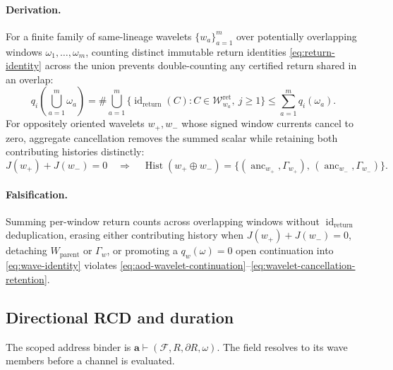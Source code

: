 \paragraph{Derivation.}
For a finite family of same-lineage wavelets \(\{w_a\}_{a=1}^m\) over
potentially overlapping windows \(\omega_1,\ldots,\omega_m\), counting distinct
immutable return identities \eqref{eq:return-identity} across the union
prevents double-counting any certified return shared in an overlap:
\begin{equation}
q_i\!\left(\bigcup_{a=1}^m\omega_a\right)
=\#\bigcup_{a=1}^m\bigl\{\operatorname{id}_{\mathrm{return}}(C):C\in\mathcal W_{w_a}^{\mathrm{ret}},\ j\ge 1\bigr\}
\le\sum_{a=1}^m q_i(\omega_a).
\label{eq:wavelet-overlap-dedup}
\end{equation}
For oppositely oriented wavelets \(w_+,w_-\) whose signed window currents
cancel to zero, aggregate cancellation removes the summed scalar while
retaining both contributing histories distinctly:
\begin{equation}
J(w_+)+J(w_-)=0
\quad\Longrightarrow\quad
\operatorname{Hist}(w_+\oplus w_-)=\bigl\{(\operatorname{anc}_{w_+},\Gamma_{w_+}),\,(\operatorname{anc}_{w_-},\Gamma_{w_-})\bigr\}.
\label{eq:wavelet-cancellation-retention}
\end{equation}

\paragraph{Falsification.}
Summing per-window return counts across overlapping windows without
\(\operatorname{id}_{\mathrm{return}}\) deduplication, erasing either
contributing history when \(J(w_+)+J(w_-)=0\), detaching \(W_{\mathrm{parent}}\)
or \(\Gamma_w\), or promoting a \(q_w(\omega)=0\) open continuation into
\eqref{eq:wave-identity} violates \eqref{eq:aod-wavelet-continuation}--\eqref{eq:wavelet-cancellation-retention}.


\subsection{Directional RCD and duration}
\label{sec:boundary-accounting}
\label{subsec:boundary-scope}
The scoped address binder is \(\mathbf a\vdash(\mathcal F,R,\partial R,\omega)\).
The field resolves to its wave members before a channel is evaluated.

